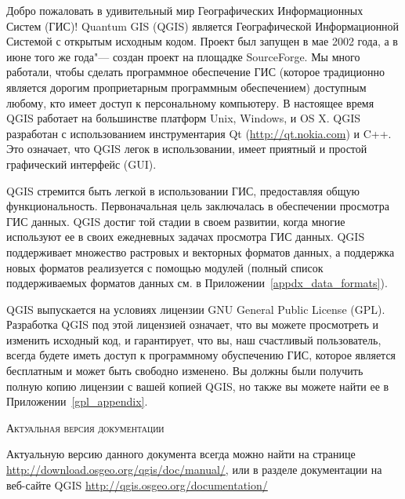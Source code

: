 \mainmatter
\pagestyle{scrheadings}
\label{label_forward}



Добро пожаловать в удивительный мир Географических Информационных Систем
(ГИС)! Quantum GIS (QGIS) является Географической Информационной
Системой с открытым исходным кодом. Проект был запущен в мае 2002 года,
а в июне того же года"--- создан проект на площадке SourceForge. Мы
много работали, чтобы сделать программное обеспечение ГИС (которое
традиционно является дорогим проприетарным программным обеспечением)
доступным любому, кто имеет доступ к персональному компьютеру.
В настоящее время QGIS работает на большинстве платформ Unix, Windows, и
OS X. QGIS разработан с использованием инструментария Qt
(\url{http://qt.nokia.com}) и C++. Это означает, что QGIS легок в
использовании, имеет приятный и простой графический интерфейс (GUI).

QGIS стремится быть легкой в использовании ГИС, предоставляя общую
функциональность. Первоначальная цель заключалась в обеспечении
просмотра ГИС данных. QGIS достиг той стадии в своем развитии, когда
многие используют ее в своих ежедневных задачах просмотра ГИС данных.
QGIS поддерживает множество растровых и векторных форматов данных, а
поддержка новых форматов реализуется с помощью модулей (полный список
поддерживаемых форматов данных см. в Приложении~\ref{appdx_data_formats}).

QGIS выпускается на условиях лицензии GNU General Public License (GPL).
Разработка QGIS под этой лицензией означает, что вы можете просмотреть и
изменить исходный код, и гарантирует, что вы, наш счастливый
пользователь, всегда будете иметь доступ к программному обуспечению ГИС,
которое является бесплатным и может быть свободно изменено. Вы должны
были получить полную копию лицензии с вашей копией QGIS, но также вы
можете найти ее в Приложении~\ref{gpl_appendix}.

\begin{Tip}\caption{\textsc{Актуальная версия документации}}
Актуальную версию данного документа всегда можно найти на странице
\url{http://download.osgeo.org/qgis/doc/manual/}, или в разделе
документации на веб-сайте QGIS \url{http://qgis.osgeo.org/documentation/}
\end{Tip}

\label{label_majfeat}

